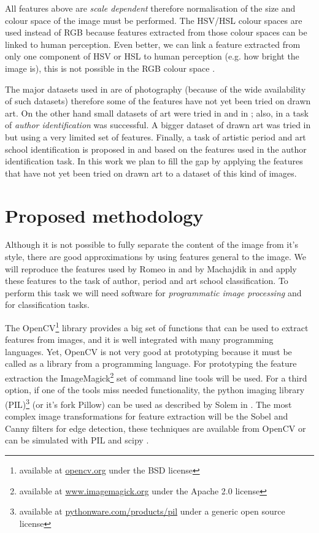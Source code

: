 \documentclass[a4paper]{article}
\begin{document}
All features above are \emph{scale dependent} \cite{rmc12ajs,mach10clas}
therefore normalisation of the size and colour space of the image must be
performed.  The HSV/HSL colour spaces are used instead of RGB because features
extracted from those colour spaces can be linked to human perception.  Even
better, we can link a feature extracted from only one component of HSV or HSL
to human perception (e.g. how bright the image is), this is not possible in the
RGB colour space \cite{rmc12ajs}.

The major datasets used in \cite{jma12clas,mach10clas} are of photography
(because of the wide availability of such datasets) therefore some of the
features have not yet been tried on drawn art.  On the other hand small
datasets of art were tried in \cite{mach10clas} and in \cite{rmc12ajs};  also,
in \cite{rmc12ajs} a task of \emph{author identification} was successful.  A
bigger dataset of drawn art was tried in \cite{zirnhelt07art} but using a very
limited set of features.  Finally, a task of artistic period and art school
identification is proposed in \cite{zirnhelt07art} and \cite{rmc12ajs} based on
the features used in the author identification task.  In this work we plan to
fill the gap by applying the features that have not yet been tried on drawn art
to a dataset of this kind of images.

\section{Proposed methodology}

Although it is not possible to fully separate the content of the image from
it's style, there are good approximations by using features general to the
image.  We will reproduce the features used by Romeo in \cite{rmc12ajs} and by
Machajdik in \cite{mach10clas} and apply these features to the task of author,
period and art school classification.  To perform this task we will need
software for \emph{programmatic image processing} and for classification tasks.

The OpenCV\footnote{available at \href{http://opencv.org/}{opencv.org} under
the BSD license} library provides a big set of functions that can be used to
extract features from images, and it is well integrated with many programming
languages.  Yet, OpenCV is not very good at prototyping because it must be
called as a library from a programming language.  For prototyping the feature
extraction the ImageMagick\footnote{available at
\href{http://www.imagemagick.org/}{www.imagemagick.org} under the Apache 2.0
license} set of command line tools will be used.  For a third option, if one of
the tools miss needed functionality, the python imaging library
(PIL)\footnote{available at
\href{http://pythonware.com/products/pil/}{pythonware.com/products/pil} under a
generic open source license} (or it's fork Pillow) can be used as described by
Solem in \cite{solem12book}.  The most complex image transformations for
feature extraction will be the Sobel and Canny filters for edge detection,
these techniques are available from OpenCV or can be simulated with PIL and
scipy \cite{oliphant06numpy}.
\end{document}
